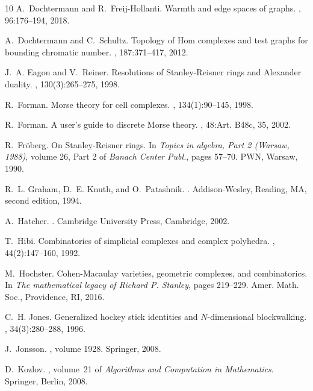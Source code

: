 \documentclass[11pt,reqno,a4paper]{amsart}
\theoremstyle{definition}
\theoremstyle{theorem}
\theoremstyle{remark}
\begin{document}
\begin{thebibliography}{10}
	A.~Dochtermann and R.~Freij-Hollanti.
	\newblock Warmth and edge spaces of graphs.
	, 96:176--194, 2018.
	
	A.~Dochtermann and C.~Schultz.
	\newblock Topology of {H}om complexes and test graphs for bounding chromatic
	number.
	, 187:371--417, 2012.
	
	J.~A. Eagon and V.~Reiner.
	\newblock Resolutions of {S}tanley-{R}eisner rings and {A}lexander duality.
	, 130(3):265--275, 1998.
	
	R.~Forman.
	\newblock Morse theory for cell complexes.
	, 134(1):90--145, 1998.
	
	R.~Forman.
	\newblock A user's guide to discrete {M}orse theory.
	, 48:Art. B48c, 35, 2002.
	
	R.~Fr\"oberg.
	\newblock On {S}tanley-{R}eisner rings.
	\newblock In {\em Topics in algebra, {P}art 2 ({W}arsaw, 1988)}, volume 26,
	Part 2 of {\em Banach Center Publ.}, pages 57--70. PWN, Warsaw, 1990.
	
	R.~L. Graham, D.~E. Knuth, and O.~Patashnik.
	.
	\newblock Addison-Wesley, Reading, MA, second edition, 1994.
	
	A.~Hatcher.
	.
	\newblock Cambridge University Press, Cambridge, 2002.
	
	T.~Hibi.
	\newblock Combinatorics of simplicial complexes and complex polyhedra.
	, 44(2):147--160, 1992.
	
	M.~Hochster.
	\newblock Cohen-{M}acaulay varieties, geometric complexes, and combinatorics.
	\newblock In {\em The mathematical legacy of {R}ichard {P}. {S}tanley}, pages
	219--229. Amer. Math. Soc., Providence, RI, 2016.
	
	C.~H. Jones.
	\newblock Generalized hockey stick identities and {$N$}-dimensional
	blockwalking.
	, 34(3):280--288, 1996.
	
	J.~Jonsson.
	, volume 1928.
	\newblock Springer, 2008.
	
	D.~Kozlov.
	, volume~21 of {\em Algorithms
		and Computation in Mathematics}.
	\newblock Springer, Berlin, 2008.
	

\end{thebibliography}
\end{document}
